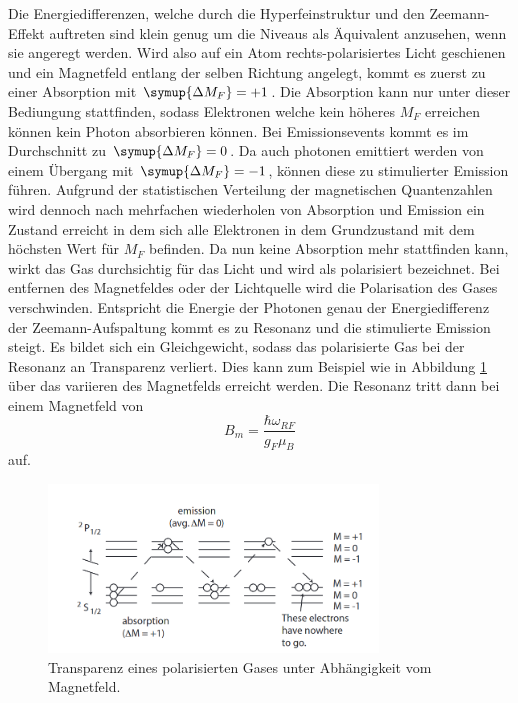 Die Energiedifferenzen, welche durch die Hyperfeinstruktur und den Zeemann-Effekt auftreten sind klein genug um die Niveaus als Äquivalent anzusehen, wenn sie angeregt werden.
Wird also auf ein Atom rechts-polarisiertes Licht geschienen und ein Magnetfeld entlang der selben Richtung angelegt, kommt es zuerst zu einer Absorption mit $\symup{\Delta{M_F}} = +1$.
Die Absorption kann nur unter dieser Bediungung stattfinden, sodass Elektronen welche kein höheres $M_F$ erreichen können kein Photon absorbieren können.
Bei Emissionsevents kommt es im Durchschnitt zu $\symup{\Delta{M_F}} = 0$. Da auch photonen emittiert werden von einem Übergang mit $\symup{\Delta{M_F}} = -1$, können diese zu
stimulierter Emission führen. Aufgrund der statistischen Verteilung der magnetischen Quantenzahlen wird dennoch nach mehrfachen wiederholen von Absorption und Emission ein Zustand erreicht
in dem sich alle Elektronen in dem Grundzustand mit dem höchsten Wert für $M_F$ befinden. Da nun keine Absorption mehr stattfinden kann, wirkt das Gas durchsichtig für das Licht und wird als polarisiert bezeichnet.
Bei entfernen des Magnetfeldes oder der Lichtquelle wird die Polarisation des Gases verschwinden. Entspricht die Energie der Photonen genau der Energiedifferenz der Zeemann-Aufspaltung kommt es zu
Resonanz und die stimulierte Emission steigt. Es bildet sich ein Gleichgewicht, sodass das polarisierte Gas bei der Resonanz an Transparenz verliert.
Dies kann zum Beispiel wie in Abbildung \ref{pic:resonanz} über das variieren des Magnetfelds erreicht werden. Die Resonanz tritt dann bei einem Magnetfeld von 
\begin{equation}
    B_m = \frac{\hbar \omega_{RF}}{g_F \mu_B}
\end{equation}
auf.
\begin{figure}
    \centering
    \includegraphics[width = 0.78\textwidth]{pics/pumpen.png}
    \caption{Transparenz eines polarisierten Gases unter Abhängigkeit vom Magnetfeld.\cite{V21}}
    \label{pic:resonanz}
\end{figure}



